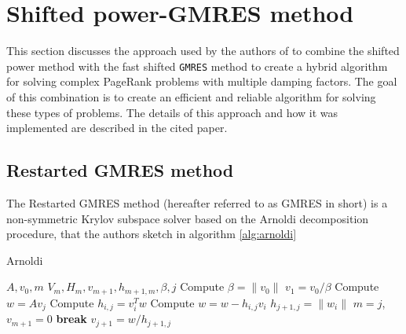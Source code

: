 \clearpage
\section{Shifted power-GMRES method}

This section discusses the approach used by the authors of \cite{SHEN2022126799} to combine the shifted power method with the fast shifted \texttt{GMRES} method to create a hybrid algorithm for solving complex PageRank problems with multiple damping factors. The goal of this combination is to create an efficient and reliable algorithm for solving these types of problems. The details of this approach and how it was implemented are described in the cited paper.

\subsection{Restarted GMRES method}

The Restarted GMRES method (hereafter referred to as GMRES in short) is a non-symmetric Krylov subspace solver based on the Arnoldi decomposition procedure, that the authors sketch in algorithm \ref{alg:arnoldi}

\begin{algorithm}[H]
\caption{Arnoldi}
\label{alg:arnoldi}
\begin{algorithmic}[1]
    \Require $A, v_0, m$
    \Ensure $V_m, H_m, v_{m+1}, h_{m+1,m}, \beta, j$
    \State Compute $\beta = \lVert v_0 \rVert$
    \State $v_1 = v_0/ \beta$
        \State Compute $w = Av_j$
            \State Compute $h_{i,j} = v_i^T w$
            \State Compute $w = w - h_{i,j} v_i$
        \EndFor
        \State $h_{j+1,j} = \lVert w_i \rVert$
            \State $m = j$, 
            \State $v_{m+1} = 0$
            \State \textbf{break}
        \Else
            \State $v_{j+1} = w / h_{j+1,j}$
        \EndIf
    \EndFor
\end{algorithmic}
\end{algorithm}

